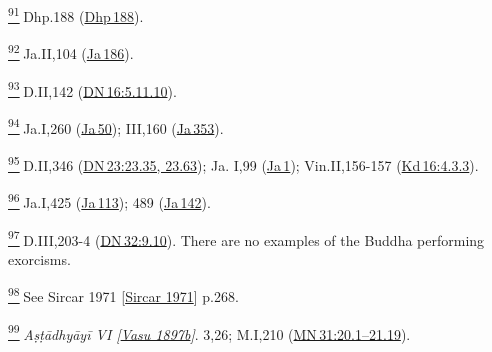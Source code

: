 \label{footprints_split_024.html_fn91}
\hyperref[footprints_split_007.htmlux5cux23fnref91]{\textsuperscript{91}} Dhp.188
(\href{https://suttacentral.net/dhp188/en/sujato}{Dhp\,188}).

\label{footprints_split_024.html_fn92}
\hyperref[footprints_split_007.htmlux5cux23fnref92]{\textsuperscript{92}} Ja.II,104
(\href{https://suttacentral.net/ja186}{Ja\,186}).

\label{footprints_split_024.html_fn93}
\hyperref[footprints_split_007.htmlux5cux23fnref93]{\textsuperscript{93}} D.II,142
(\href{https://suttacentral.net/dn16/en/sujato\#5.11.10}{DN\,16:5.11.10}).

\label{footprints_split_024.html_fn94}
\hyperref[footprints_split_007.htmlux5cux23fnref94]{\textsuperscript{94}} Ja.I,260
(\href{https://suttacentral.net/ja50}{Ja\,50}); III,160
(\href{https://suttacentral.net/ja353}{Ja\,353}).

\label{footprints_split_024.html_fn95}
\hyperref[footprints_split_007.htmlux5cux23fnref95]{\textsuperscript{95}} D.II,346
(\href{https://suttacentral.net/dn23/en/sujato\#23.35}{DN\,23:23.35,
23.63}); Ja. I,99 (\href{https://suttacentral.net/ja1}{Ja\,1});
Vin.II,156-157
(\href{https://suttacentral.net/pli-tv-kd16/en/brahmali\#4.3.3}{Kd\,16:4.3.3}).

\label{footprints_split_024.html_fn96}
\hyperref[footprints_split_007.htmlux5cux23fnref96]{\textsuperscript{96}} Ja.I,425
(\href{https://suttacentral.net/ja113}{Ja\,113}); 489
(\href{https://suttacentral.net/ja142}{Ja\,142}).

\label{footprints_split_024.html_fn97}
\hyperref[footprints_split_007.htmlux5cux23fnref97]{\textsuperscript{97}} D.III,203-4
(\href{https://suttacentral.net/dn32/en/sujato\#9.10}{DN\,32:9.10}).
There are no examples of the Buddha performing exorcisms.

\label{footprints_split_024.html_fn98}
\hyperref[footprints_split_007.htmlux5cux23fnref98]{\textsuperscript{98}} See
{Sircar 1971
{{[}\hyperref[footprints_split_022.htmlux5cux23Sircarux5cux25201971]{Sircar
1971}{]}}} p.268.

\label{footprints_split_024.html_fn99}
\hyperref[footprints_split_007.htmlux5cux23fnref99]{\textsuperscript{99}} \emph{{Aṣṭādhyāyī
VI
{{[}\hyperref[footprints_split_023.htmlux5cux23Vasuux5cux25201897b]{Vasu
1897b}{]}}}}. 3,26; M.I,210
(\href{https://suttacentral.net/mn31/en/sujato\#20.1}{MN\,31:20.1--21.19}).

